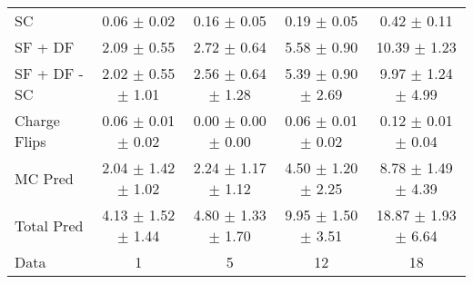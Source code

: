 \begin{tabular}{l|cccc}
                                 SC &  0.06 $\pm$  0.02 &  0.16 $\pm$  0.05 &  0.19 $\pm$  0.05 &  0.42 $\pm$  0.11 \\
                            SF + DF &  2.09 $\pm$  0.55 &  2.72 $\pm$  0.64 &  5.58 $\pm$  0.90 & 10.39 $\pm$  1.23 \\
\hline
                       SF + DF - SC &  2.02 $\pm$  0.55 $\pm$  1.01 &  2.56 $\pm$  0.64 $\pm$  1.28 &  5.39 $\pm$  0.90 $\pm$  2.69 &  9.97 $\pm$  1.24 $\pm$  4.99 \\
\hline\hline
                       Charge Flips &  0.06 $\pm$  0.01 $\pm$  0.02 &  0.00 $\pm$  0.00 $\pm$  0.00 &  0.06 $\pm$  0.01 $\pm$  0.02 &  0.12 $\pm$  0.01 $\pm$  0.04 \\
\hline
                            MC Pred &  2.04 $\pm$  1.42 $\pm$  1.02 &  2.24 $\pm$  1.17 $\pm$  1.12 &  4.50 $\pm$  1.20 $\pm$  2.25 &  8.78 $\pm$  1.49 $\pm$  4.39 \\
\hline
                         Total Pred &  4.13 $\pm$  1.52 $\pm$  1.44 &  4.80 $\pm$  1.33 $\pm$  1.70 &  9.95 $\pm$  1.50 $\pm$  3.51 & 18.87 $\pm$  1.93 $\pm$  6.64 \\
\hline\hline
                               Data &     1 &     5 &    12 &    18 \\
\hline\hline
\end{tabular}

